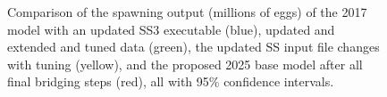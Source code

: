 \documentclass[
]{scrartcl}
\begin{document}
\begin{figure}


\caption{\label{fig-bridge23-comp2}Comparison of the spawning output
(millions of eggs) of the 2017 model with an updated SS3 executable
(blue), updated and extended and tuned data (green), the updated SS
input file changes with tuning (yellow), and the proposed 2025 base
model after all final bridging steps (red), all with 95\% confidence
intervals.}

\end{figure}%
\end{document}
